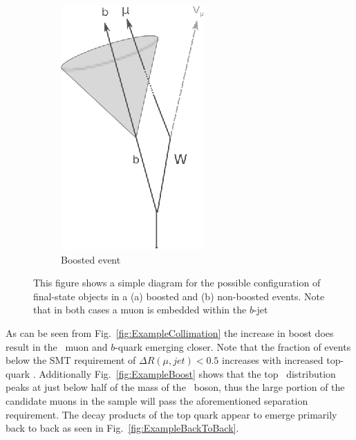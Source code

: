 \begin{figure}[t]
\begin{subfigure}[b]{0.45\textwidth}
    \includegraphics[width=\textwidth]{PartBoosted/Plots/Boosted.eps}
    \caption{Boosted event} \label{fig:BoostedDiagram}
  \end{subfigure}
  \caption{This figure shows a simple diagram for the possible configuration of final-state objects in a (a) boosted and (b) non-boosted events. Note that in both cases a muon is embedded within the $b$-jet} \label{fig:SimpleAngularDiagrams}

\end{figure}

As can be seen from Fig.~\ref{fig:ExampleCollimation} the increase in boost does result in the \W\ muon and $b$-quark emerging closer. Note that the fraction of events below the SMT requirement of $\Delta R(\mu,jet)<0.5$ increases with increased top-quark \pt. Additionally Fig.~\ref{fig:ExampleBoost} shows that the top \pt\ distribution peaks at just below half of the mass of the \Zprime\ boson, thus the large portion of the candidate muons in the sample will pass the aforementioned separation requirement. The decay products of the top quark appear to emerge primarily back to back as seen in Fig.~\ref{fig:ExampleBackToBack}.

